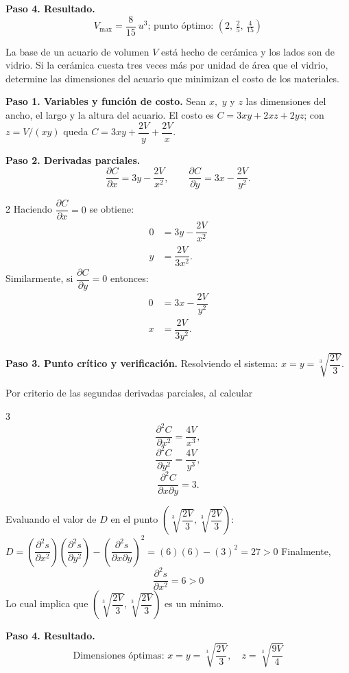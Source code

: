 \begin{prob}
\begin{myproof}
\textbf{Paso 4. Resultado.}
\[
\boxed{V_{\max}=\dfrac{8}{15}\ u^3\text{; punto óptimo: }\left(2,\,\tfrac{2}{5},\,\tfrac{4}{15}\right)}
\]
\end{myproof}
\end{prob}

\begin{prob}
La base de un acuario de volumen $V$ está hecho de cerámica y los lados son de vidrio. Si la cerámica cuesta tres veces más por unidad de área que el vidrio, determine las dimensiones del acuario que minimizan el costo de los materiales.
\begin{myproof}
\textbf{Paso 1. Variables y función de costo.}
Sean $x,$ $y$ y $z$ las dimensiones del ancho, el largo y la altura del acuario. El costo es $C=3xy+2xz+2yz$; con $z=V/(xy)$ queda $C=3xy+\dfrac{2V}{y}+\dfrac{2V}{x}.$

\textbf{Paso 2. Derivadas parciales.}
$$\dfrac{\partial C}{\partial x}=3y-\dfrac{2V}{x^2},\qquad \dfrac{\partial C}{\partial y}=3x-\dfrac{2V}{y^2}.$$
\begin{multicols}{2}
Haciendo $\dfrac{\partial C}{\partial x}=0$ se obtiene:
\begin{align*}
0&=3y-\dfrac{2V}{x^2}\\
y&=\dfrac{2V}{3x^2}.
\end{align*}
\columnbreak
Similarmente, si $\dfrac{\partial C}{\partial y}=0$ entonces:
\begin{align*}
0&=3x-\dfrac{2V}{y^2}\\
x&=\dfrac{2V}{3y^2}.
\end{align*}
\end{multicols}
\textbf{Paso 3. Punto crítico y verificación.}
Resolviendo el sistema: $x=y=\sqrt[3]{\dfrac{2V}{3}}.$

Por criterio de las segundas derivadas parciales, al calcular
\begin{multicols}{3}
$$\dfrac{\partial^2 C}{\partial x^2}=\dfrac{4V}{x^3},$$ $$\dfrac{\partial^2 C}{\partial y^2}=\dfrac{4V}{y^3},$$ $$\dfrac{\partial^2 C}{\partial x\partial y}=3.$$
\end{multicols}
Evaluando el valor de $D$ en el punto $\left( \sqrt[3]{\dfrac{2V}{3}},\sqrt[3]{\dfrac{2V}{3}} \right)$:
$D=\left(\dfrac{\partial^2 s}{\partial x^2}\right)\left(\dfrac{\partial^2 s}{\partial y^2}\right)-\left(\dfrac{\partial^2 s}{\partial x\partial y}\right)^2=\left(  6  \right)\left( 6 \right)-\left(3 \right)^2 = 27>0$
Finalmente,  $$\dfrac{\partial^2 s}{\partial x^2}=6>0$$
Lo cual implica que $\left( \sqrt[3]{\dfrac{2V}{3}},\sqrt[3]{\dfrac{2V}{3}} \right)$ es un mínimo.

\textbf{Paso 4. Resultado.}
\[
\boxed{\text{Dimensiones óptimas: }x=y=\sqrt[3]{\dfrac{2V}{3}},\quad z=\sqrt[3]{\dfrac{9V}{4}}}
\]
\end{myproof}
\end{prob}

